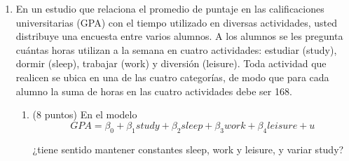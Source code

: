 \documentclass[10pt,a4paper]{article}
\begin{document}
\begin{enumerate}
\begin{enumerate}
{Es menor al $R^2$ dado que el $\bar{R^2}$ penaliza por la disminución de grados de de libertad al incluir varios regresores al modelo, aunque su variación es pequeña dado que se tiene una gran cantidad de datos versus la cantidad de variables del modelo.}

\item (20 puntos) Considerando que:

\[(X^\top X)^{-1} =
\begin{bmatrix}
8,5 & 0,19 & -0,11 \\
0,19 & 0,5 & -0,02 \\
-0,11 & -0,02 & 0,04 \\
\end{bmatrix}
\]

$$ \sum_{i=1}^{n} (y_i - \bar{y})^2=6.800$$
Determine la varianza de los estimadores de la regresión MCO.

{\color{blue} 
Sabemos que $SSR/SST = 0,727$ y $SST=6800$, por lo tanto, $SSR = 0,727\cdot 6800=4943,6 $, entonces:
$$\hat{\sigma}^2 = \frac{\sum_{i=1}^{n} \hat{u}_i^2 }{n-k-1}= \frac{SSR}{n - k - 1}=\frac{4943,6}{4137-2-1}=1,1958$$
    
    \[
\text{Var}(\hat{\beta}|X) = \hat{\sigma}^2(X^{\top}X)^{-1}
\]

Solo necesitamos la varianza de los estimadores así que  os quedamos con los elementos de la diagonal de la matriz de var-covar.

$$\text{Var}(\hat{\beta_0}|X)=10,1643\quad 
\text{Var}(\hat{\beta_1}|X)=0,5979
\quad \text{Var}(\hat{\beta_2}|X)=0,0478$$}
\end{enumerate}

\item En un estudio que relaciona el promedio de puntaje en las calificaciones universitarias (GPA) con el
tiempo utilizado en diversas actividades, usted distribuye una encuesta entre varios alumnos.
A los alumnos se les pregunta cuántas horas utilizan a la semana en cuatro actividades: estudiar (study),
dormir (sleep), trabajar (work) y diversión (leisure). Toda actividad que realicen se ubica en una de las cuatro categorías,
de modo que para cada alumno la suma de horas en las cuatro actividades debe ser 168.
\begin{enumerate}
    \item(8 puntos) En el modelo
$$GPA=\beta_0 +\beta_1 study+\beta_2 sleep+\beta_3 work +\beta_4leisure+ u$$

¿tiene sentido mantener constantes sleep, work y leisure, y variar study?


\end{enumerate}
\end{enumerate}
\end{document}
